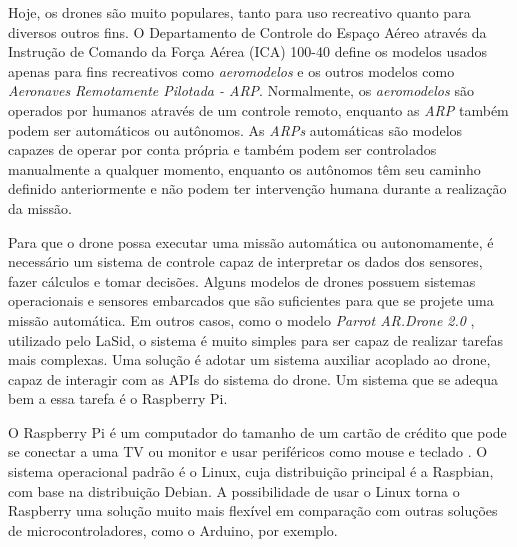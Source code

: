 

Hoje, os drones são muito populares, tanto para uso recreativo quanto para diversos outros fins. O Departamento de Controle do Espaço Aéreo através da Instrução de Comando da Força Aérea (ICA) 100-40 \cite{CEA2018} define os modelos usados apenas para fins recreativos como \textit{aeromodelos} e os outros modelos como \textit{Aeronaves Remotamente Pilotada - ARP}. Normalmente, os \textit{aeromodelos} são operados por humanos através de um controle remoto, enquanto as \textit{ARP} também podem ser automáticos ou autônomos. As \textit{ARPs} automáticas são modelos capazes de operar por conta própria e também podem ser controlados manualmente a qualquer momento, enquanto os autônomos têm seu caminho definido anteriormente e não podem ter intervenção humana durante a realização da missão.

Para que o drone possa executar uma missão automática ou autonomamente, é necessário um sistema de controle capaz de interpretar os dados dos sensores, fazer cálculos e tomar decisões. Alguns modelos de drones possuem sistemas operacionais e sensores embarcados que são suficientes para que se projete uma missão automática. Em outros casos, como o modelo \textit{Parrot AR.Drone 2.0} \cite{Parrot2019a}, utilizado pelo LaSid, o sistema é muito simples para ser capaz de realizar tarefas mais complexas. Uma solução é adotar um sistema auxiliar acoplado ao drone, capaz de interagir com as APIs do sistema do drone. Um sistema que se adequa bem a essa tarefa é o Raspberry Pi.

O Raspberry Pi é um computador do tamanho de um cartão de crédito que pode se conectar a uma TV ou monitor e usar periféricos como mouse e teclado \cite{RPF2019}. O sistema operacional padrão é o Linux, cuja distribuição principal é a Raspbian, com base na distribuição Debian. A possibilidade de usar o Linux torna o Raspberry uma solução muito mais flexível em comparação com outras soluções de microcontroladores, como o Arduino, por exemplo.

